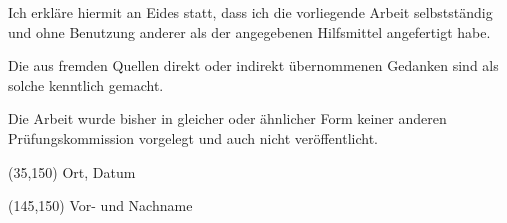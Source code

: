 Ich erkläre hiermit an Eides statt, dass ich die vorliegende Arbeit selbstständig und ohne Benutzung anderer als der angegebenen Hilfsmittel angefertigt habe.

Die aus fremden Quellen direkt oder indirekt übernommenen Gedanken sind als solche kenntlich gemacht.

Die Arbeit wurde bisher in gleicher oder ähnlicher Form keiner anderen Prüfungs\-kommission vorgelegt und auch nicht veröffentlicht.



\begin{textblock}{60}(35,150)
Ort, Datum
\end{textblock}

\begin{textblock}{60}(145,150)
Vor- und Nachname
\end{textblock}
